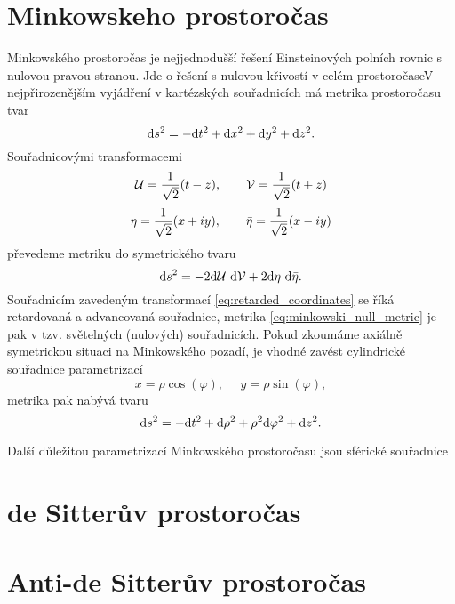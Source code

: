 \section{Minkowskeho prostoročas}
Minkowského prostoročas je nejjednodušší řešení Einsteinových polních rovnic s nulovou pravou stranou.
Jde o řešení s nulovou křivostí v celém prostoročaseV
nejpřirozenějším vyjádření v kartézských souřadnicích má metrika prostoročasu tvar
\begin{equation}
     \label{eq:minkowski}
     \mathrm{d} s^2 = - \mathrm{d} t^2 + \mathrm{d} x^2 + \mathrm{d} y^2 + \mathrm{d} z^2.
\end{equation}
Souřadnicovými transformacemi
\begin{equation}
     \label{eq:retarded_coordinates}
     \mathcal{U} = \frac{1}{\sqrt{2}} (t - z),~~~~~~\mathcal{V} = \frac{1}{\sqrt{2}} (t + z)
\end{equation}
\begin{equation}
     \eta = \frac{1}{\sqrt{2}} (x + iy), ~~~~~~\bar{\eta} = \frac{1}{\sqrt{2}} (x - iy)
\end{equation}
převedeme metriku do symetrického tvaru
\begin{equation}
     \label{eq:minkowski_null_metric}
     \mathrm{d} s^2 = -2 \mathrm{d} \mathcal{U} ~ \mathrm{d} \mathcal{V} + 2 \mathrm{d} \eta ~ \mathrm{d} \bar{\eta}.
\end{equation}
Souřadnicím zavedeným transformací \eqref{eq:retarded_coordinates} se říká retardovaná a advancovaná souřadnice,
metrika \eqref{eq:minkowski_null_metric} je pak v tzv. světelných (nulových) souřadnicích.
Pokud zkoumáme axiálně symetrickou situaci na Minkowského pozadí, je vhodné zavést cylindrické
souřadnice parametrizací
\begin{equation}
     x = \rho \cos (\varphi), ~~~~~~ y = \rho \sin (\varphi),
\end{equation}
metrika pak nabývá tvaru
\begin{equation}
     \mathrm{d} s^2 = -\mathrm{d} t^2 + \mathrm{d} \rho^2 + \rho^2 \mathrm{d} \varphi^2 + \mathrm{d} z^2.
\end{equation}

Další důležitou parametrizací Minkowského prostoročasu jsou sférické souřadnice



\section{de Sitterův prostoročas}



\section{Anti-de Sitterův prostoročas}


